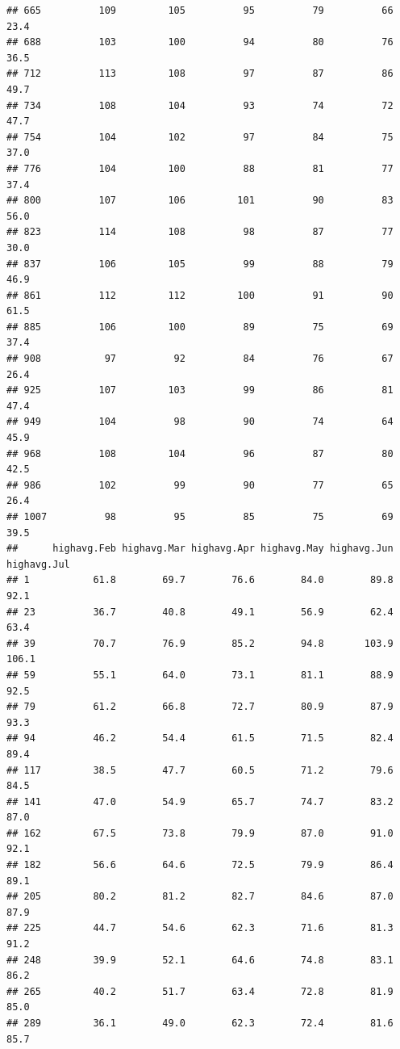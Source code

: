 \documentclass[
]{article}
\begin{document}
\begin{verbatim}
## 665          109         105          95          79          66        23.4
## 688          103         100          94          80          76        36.5
## 712          113         108          97          87          86        49.7
## 734          108         104          93          74          72        47.7
## 754          104         102          97          84          75        37.0
## 776          104         100          88          81          77        37.4
## 800          107         106         101          90          83        56.0
## 823          114         108          98          87          77        30.0
## 837          106         105          99          88          79        46.9
## 861          112         112         100          91          90        61.5
## 885          106         100          89          75          69        37.4
## 908           97          92          84          76          67        26.4
## 925          107         103          99          86          81        47.4
## 949          104          98          90          74          64        45.9
## 968          108         104          96          87          80        42.5
## 986          102          99          90          77          65        26.4
## 1007          98          95          85          75          69        39.5
##      highavg.Feb highavg.Mar highavg.Apr highavg.May highavg.Jun highavg.Jul
## 1           61.8        69.7        76.6        84.0        89.8        92.1
## 23          36.7        40.8        49.1        56.9        62.4        63.4
## 39          70.7        76.9        85.2        94.8       103.9       106.1
## 59          55.1        64.0        73.1        81.1        88.9        92.5
## 79          61.2        66.8        72.7        80.9        87.9        93.3
## 94          46.2        54.4        61.5        71.5        82.4        89.4
## 117         38.5        47.7        60.5        71.2        79.6        84.5
## 141         47.0        54.9        65.7        74.7        83.2        87.0
## 162         67.5        73.8        79.9        87.0        91.0        92.1
## 182         56.6        64.6        72.5        79.9        86.4        89.1
## 205         80.2        81.2        82.7        84.6        87.0        87.9
## 225         44.7        54.6        62.3        71.6        81.3        91.2
## 248         39.9        52.1        64.6        74.8        83.1        86.2
## 265         40.2        51.7        63.4        72.8        81.9        85.0
## 289         36.1        49.0        62.3        72.4        81.6        85.7

\end{verbatim}
\end{document}

